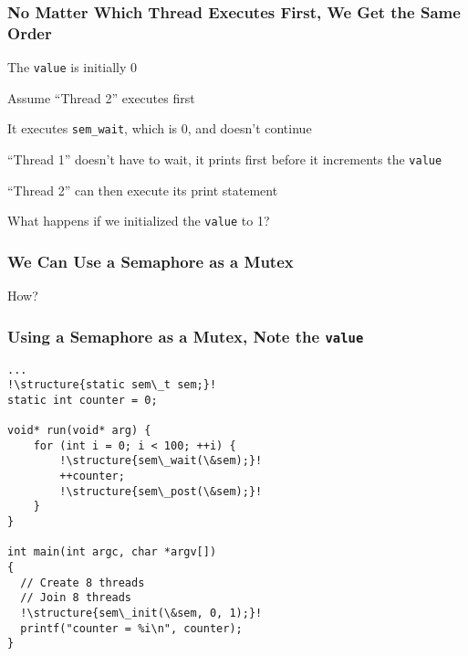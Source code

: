   \begin{frame}
    \frametitle{No Matter Which Thread Executes First, We Get the Same Order}

    The \texttt{value} is initially 0

    \vspace{2em}

    Assume ``Thread 2'' executes first

    \hspace{2em} It executes \texttt{sem\_wait}, which is 0, and doesn't
    continue

    \vspace{2em}

    ``Thread 1'' doesn't have to wait, it prints first before it increments the
    \texttt{value}

    \vspace{2em}

    ``Thread 2'' can then execute its print statement

    \vspace{2em}

    What happens if we initialized the \texttt{value} to 1?
  \end{frame}

  \begin{frame}
    \frametitle{We Can Use a Semaphore as a Mutex}

    How?
  \end{frame}

  \begin{frame}[fragile]
    \frametitle{Using a Semaphore as a Mutex, Note the \texttt{value}}

    \begin{lstlisting}[escapechar=!]
...
!\structure{static sem\_t sem;}!
static int counter = 0;

void* run(void* arg) {
    for (int i = 0; i < 100; ++i) {
        !\structure{sem\_wait(\&sem);}!
        ++counter;
        !\structure{sem\_post(\&sem);}!
    }
}

int main(int argc, char *argv[])
{
  // Create 8 threads
  // Join 8 threads
  !\structure{sem\_init(\&sem, 0, 1);}!
  printf("counter = %i\n", counter);
}
    \end{lstlisting}
  \end{frame}

